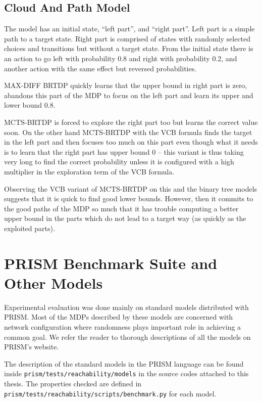 \subsection*{Cloud And Path Model}

The model has an initial state,
``left part'', and ``right part''. Left part is a simple path to a
target state. Right part is comprised of states with randomly selected
choices and transitions but without a target state.
From the initial state there is an action to go left with probability
0.8 and right with probability 0.2, and another action with the same
effect but reversed probabilities.

MAX-DIFF BRTDP quickly learns that the upper bound in right part is
zero, abandons this part of the MDP to focus on the left part and learn
its upper and lower bound 0.8.

MCTS-BRTDP is forced to explore the right part too but learns the
correct value soon. On the other hand MCTS-BRTDP with the VCB formula
finds the target in the left part and then focuses too much on this part
even though what it needs is to learn that the right part has upper
bound 0 -- this variant is thus taking very long to find the correct
probability unless it is configured with a high multiplier in the
exploration term of the VCB formula.

Observing the VCB variant of MCTS-BRTDP on this and the binary tree
models suggests that it is quick to find good lower bounds. However,
then it commits to the good paths of the MDP so much that it has trouble
computing a better upper bound in the parts which do not lead to a
target way (as quickly as the exploited parts).

\section{PRISM Benchmark Suite and Other Models}

Experimental evaluation was done mainly on standard models
distributed with PRISM. Most of the MDPs described by these models are
concerned with network configuration where randomness plays important
role in achieving a common goal.
We
refer the reader to thorough descriptions of all the models on PRISM's
website.

The description of the standard models in the PRISM language can be
found inside \verb|prism/tests/reachability/models| in the source codes
attached to this thesis. The properties checked are defined in
\verb|prism/tests/reachability/scripts/benchmark.py| for each model.

